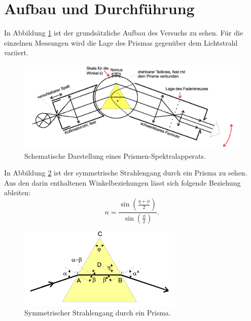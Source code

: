  \section{Aufbau und Durchführung}
\label{sec:Durchführung}

In Abbildung \ref{fig:aufbau} ist der grundsätzliche Aufbau des Versuchs zu sehen.
Für die einzelnen Messungen wird die Lage des Prismas gegenüber dem Lichtstrahl variiert.

\begin{figure}
  \centering
  \includegraphics[width = \textwidth]{Pics/Aufbau.pdf}
  \caption{Schematische Darstellung eines Prismen-Spektralapperats.}
  \label{fig:aufbau}
\end{figure}

In Abbildung \ref{fig:strahlengangsymm} ist der symmetrische Strahlengang durch ein
Prisma zu sehen. Aus den darin enthaltenen Winkelbeziehungen lässt sich
folgende Beziehung ableiten:
\begin{equation}
  n = \frac{\sin(\frac{\eta + \phi}{2})}{\sin(\frac{\phi}{2})}.
\end{equation}

\begin{figure}
  \centering
  \includegraphics[width = 0.7\textwidth]{Pics/strahlengangsymm.pdf}
  \caption{Symmetrischer Strahlengang durch ein Prisma.}
  \label{fig:strahlengangsymm}
\end{figure}

